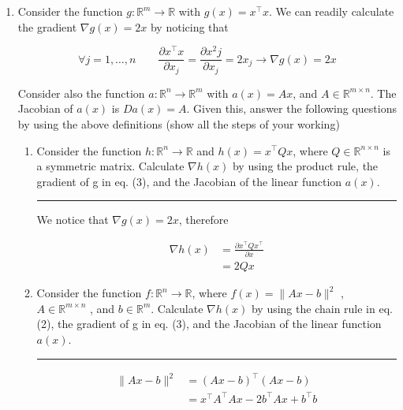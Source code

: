 \documentclass[12pt]{article}
\begin{document}
\begin{enumerate}

    \item Consider the function $g : \mathbb{R}^m \rightarrow \mathbb{R}$ with $g(x)= x^\intercal x$. We can readily calculate the gradient $\nabla g(x)=2x$ by noticing that 
    
    \begin{equation}
        \forall j = 1, \dots, n \qquad \frac{\partial x^\intercal x}{\partial x_j} = \frac{\partial x^2 j}{\partial x_j} = 2x_j \rightarrow \nabla g(x) = 2x
    \end{equation}

    Consider also the function $a : \mathbb{R}^n \rightarrow \mathbb{R}^m$ with $a(x)= Ax$, and $A \in \mathbb{R}^{m \times n}$. The Jacobian of $a(x)$ is $Da(x)= A$. 
    Given this, answer the following questions by using the above definitions (show all the steps of your working) 

    \begin{enumerate}

        \item Consider the function $h : \mathbb{R}^n \rightarrow \mathbb{R}$ and $h(x)= x^\intercal Qx$, where $Q \in \mathbb{R}^{n \times n}$ is a symmetric matrix. Calculate $\nabla h(x)$ by using the product rule, the gradient of g in eq. (3), and the Jacobian of the linear function $a(x)$. 
        
        \noindent\rule{\linewidth}{1pt}
        
        We notice that $\nabla g(x)=2x$, therefore 

        \begin{align*}
            \nabla h(x) &= \frac{\partial x^\intercal Qx^\intercal}{\partial x} \\
                        &= 2Qx
        \end{align*}
        
        \item Consider the function $f : \mathbb{R}^n \rightarrow \mathbb{R}$, where $f(x)= \lVert Ax - b \rVert ^2$ , $A \in \mathbb{R}^{m \times n}$ , and $b \in \mathbb{R}^m $. Calculate $\nabla h(x)$ by using the chain rule in eq. (2), the gradient of g in eq. (3), and the Jacobian of the linear function $a(x)$. 
        
        \noindent\rule{\linewidth}{1pt}

        \begin{align*}
            \lVert Ax - b \rVert ^2 &= (Ax - b)^\intercal (Ax - b) \\
            &= x^\intercal A^\intercal Ax-2b^\intercal Ax+b^\intercal b \\
        \end{align*}


\end{enumerate}
\end{enumerate}
\end{document}
